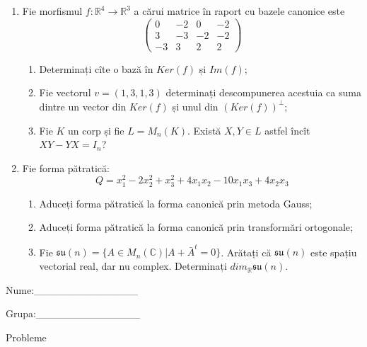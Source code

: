 \documentclass{article}
\begin{document}
\begin{enumerate}
 \item Fie morfismul $f:\mathbb{R}^4 \to \mathbb{R}^3$ a cărui matrice în raport cu bazele canonice este
$$\begin{pmatrix}
0&-2&0&-2\\
3&-3&-2&-2\\
-3&3&2&2
\end{pmatrix}$$

\begin{enumerate}
\item Determinați cîte o bază în $Ker(f)$ și $Im(f)$;
\item Fie vectorul $v=(1,3,1,3)$ determinați descompunerea acestuia ca suma dintre un vector din $Ker(f)$ și unul din $(Ker(f))^\perp$;
\item Fie $K$ un corp și fie $L=M_n(K)$. Există $X,Y \in L$ astfel încît $XY-YX=I_n$?  
\end{enumerate}
\item Fie forma pătratică:
$$Q= x_1^2-2x_2^2+x_3^2+4x_1x_2-10x_1x_3+4x_2x_3$$

\begin{enumerate}
\item Aduceți forma pătratică la forma canonică prin metoda Gauss;
\item Aduceți forma pătratică la forma canonică prin transformări ortogonale;
\item Fie $\mathfrak{su}(n)=\{ A \in M_n(\mathbb{C}) | A+\bar{A}^t=0\}$. Arătați că $\mathfrak{su}(n)$ este spațiu vectorial real, dar nu complex.
Determinați $dim_{\mathbb{R}}\mathfrak{su}(n)$.
\end{enumerate}
\end{enumerate}
\newpage
\begin{flushright}
Nume:\_\_\_\_\_\_\_\_\_\_\_\_\_\_
 
 
Grupa:\_\_\_\_\_\_\_\_\_\_\_\_\_\_
\end{flushright}
\begin{center}
\vspace{2cm}
{\Large Probleme}
\vspace{2cm}
\end{center}
\end{document}
